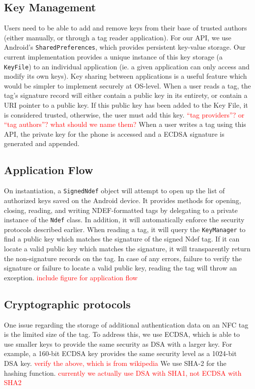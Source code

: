 \documentclass[12pt]{article}
\newcommand\TODO[1]{\textcolor{red}{#1}}
\begin{document}
\subsection{Key Management}
Users need to be able to add and remove keys from their base of trusted authors (either manually, or through a tag reader application).
For our API, we use Android's \texttt{SharedPreferences}, which provides persistent key-value storage.
Our current implementation provides a unique instance of this key storage (a \texttt{KeyFile}) to an individual application (ie. a given application can only access and modify its own keys).
Key sharing between applications is a useful feature which would be simpler to implement securely at OS-level.
When a user reads a tag, the tag's signature record will either contain a public key in its entirety, or contain a URI pointer to a public key.
If this public key has been added to the Key File, it is considered trusted, otherwise, the user must add this key.
\TODO{``tag providers''? or ``tag authors''? what should we name them?}
When a user writes a tag using this API, the private key for the phone is accessed and a ECDSA signature is generated and appended.

\subsection{Application Flow}
On instantiation, a \texttt{SignedNdef} object will attempt to open up the list of authorized keys saved on the Android device.
It provides methods for opening, closing, reading, and writing NDEF-formatted tags by delegating to a private instance of the \texttt{Ndef} class.
In addition, it will automatically enforce the security protocols described earlier.
When reading a tag, it will query the \texttt{KeyManager} to find a public key which matches the signature of the signed Ndef tag.
If it can locate a valid public key which matches the signature, it will transparently return the non-signature records on the tag.
In case of any errors, failure to verify the signature or failure to locate a valid public key, reading the tag will throw an exception.
\TODO{include figure for application flow}

\subsection{Cryptographic protocols}
One issue regarding the storage of additional authentication data on an NFC tag is the limited size of the tag.
To address this, we use ECDSA, which is able to use smaller keys to provide the same security as DSA with a larger key.
For example, a 160-bit ECDSA key provides the same security level as a 1024-bit DSA key.
\TODO{verify the above, which is from wikipedia}
We use SHA-2 for the hashing function.
\TODO{currently we actually use DSA with SHA1, not ECDSA with SHA2}
\end{document}
